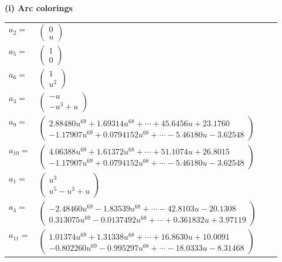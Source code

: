\documentclass[1p]{elsarticle_modified}
\theoremstyle{definition}
\begin{document}
\flushleft \textbf{(i) Arc colorings}\\
\begin{tabular}{m{7pt} m{180pt} m{7pt} m{180pt} }
\flushright $a_{2}=$&$\begin{pmatrix}0\\u\end{pmatrix}$ \\
\flushright $a_{5}=$&$\begin{pmatrix}1\\0\end{pmatrix}$ \\
\flushright $a_{6}=$&$\begin{pmatrix}1\\u^2\end{pmatrix}$ \\
\flushright $a_{3}=$&$\begin{pmatrix}- u\\- u^3+u\end{pmatrix}$ \\
\flushright $a_{9}=$&$\begin{pmatrix}2.88480 u^{69}+1.69314 u^{68}+\cdots+45.6456 u+23.1760\\-1.17907 u^{69}+0.0794152 u^{68}+\cdots-5.46180 u-3.62548\end{pmatrix}$ \\
\flushright $a_{10}=$&$\begin{pmatrix}4.06388 u^{69}+1.61372 u^{68}+\cdots+51.1074 u+26.8015\\-1.17907 u^{69}+0.0794152 u^{68}+\cdots-5.46180 u-3.62548\end{pmatrix}$ \\
\flushright $a_{1}=$&$\begin{pmatrix}u^3\\u^5- u^3+u\end{pmatrix}$ \\
\flushright $a_{4}=$&$\begin{pmatrix}-2.48460 u^{69}-1.83539 u^{68}+\cdots-42.8103 u-20.1308\\0.313075 u^{69}-0.0137492 u^{68}+\cdots+0.361832 u+3.97119\end{pmatrix}$ \\
\flushright $a_{11}=$&$\begin{pmatrix}1.01374 u^{69}+1.31338 u^{68}+\cdots+16.8630 u+10.0091\\-0.802260 u^{69}-0.995297 u^{68}+\cdots-18.0333 u-8.31468\end{pmatrix}$ \\

\end{tabular}
\end{document}

